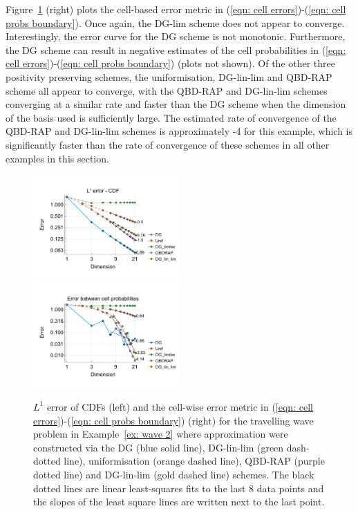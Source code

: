 \begin{example}
Figure~\ref{fig: fun 2 wave} (right) plots the cell-based error metric in (\ref{eqn: cell errors})-(\ref{eqn: cell probs boundary}). Once again, the DG-lim scheme does not appear to converge. Interestingly, the error curve for the DG scheme is not monotonic. Furthermore, the DG scheme can result in negative estimates of the cell probabilities in (\ref{eqn: cell errors})-(\ref{eqn: cell probs boundary}) (plots not shown). Of the other three positivity preserving schemes, the uniformisation, DG-lin-lim and QBD-RAP scheme all appear to converge, with the QBD-RAP and DG-lin-lim schemes converging at a similar rate and faster than the DG scheme when the dimension of the basis used is sufficiently large. The estimated rate of convergence of the QBD-RAP and DG-lin-lim schemes is approximately -4 for this example, which is significantly faster than the rate of convergence of these schemes in all other examples in this section. 
\begin{figure}[h]
	\centering
	\includegraphics[width=0.5\textwidth,trim={0.75cm 0.8cm 0.25cm 1.25cm},clip]{chapter6/figs/wave/fun2/meshs_l1_cdf_error_formatted.pdf}%
	\includegraphics[width=0.5\textwidth,trim={0.75cm 0.8cm 0.25cm 1.25cm},clip]{chapter6/figs/wave/fun2/L1_cell_probs.pdf} 
	\caption{\(L^1\) error of CDFs (left) and the cell-wise error metric in (\ref{eqn: cell errors})-(\ref{eqn: cell probs boundary}) (right) for the travelling wave problem in Example~\ref{ex: wave 2} where approximation were constructed via the DG (blue solid line), DG-lin-lim (green dash-dotted line), uniformisation (orange dashed line), QBD-RAP (purple dotted line) and DG-lin-lim (gold dashed line) schemes. The black dotted lines are linear least-squares fits to the last 8 data points and the slopes of the least square lines are written next to the last point.} 
	\label{fig: fun 2 wave} 
\end{figure}
\exampleFloatBarrier
\end{example}

